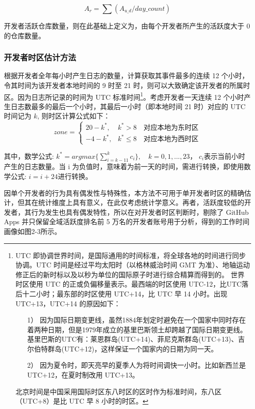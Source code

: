 $$ A_{r} = \sum (A_{u\_d} / day\_count) $$

开发者活跃仓库数量，则在此基础上定义为，由每个开发者所产生的活跃度大于 0 的仓库数量。

\subsubsection{开发者时区估计方法}

\par 根据开发者全年每小时产生日志的数量，计算获取其事件最多的连续 12 个小时，令其时间为该开发者本地时间的 9 时至 21 时，则可以大致确定该开发者的所属时区。因为日志所记录的时间为 UTC 标准时间\footnote{
UTC 即协调世界时间，是国际通用的时间标准，将全球各地的时间进行同步协调。UTC 时间是经过平均太阳时（以格林威治时间 GMT 为准）、地轴运动修正后的新时标以及以秒为单位的国际原子时进行综合精算而得到的。
世界时区使用 UTC 的正或负偏移量表示。最西端的时区使用 UTC-12，比UTC落后十二小时；最东部的时区使用 UTC+14，比 UTC 早 14 小时。出现 UTC+13，UTC+14 的原因如下：
    \begin{enumerate}
        \item[1）] 因为国际日期变更线，虽然1884年划定时避免在一个国家中同时存在着两种日期，但是1979年成立的基里巴斯领土却跨越了国际日期变更线。基里巴斯的UTC有：莱恩群岛(UTC+14)、菲尼克斯群岛(UTC+13)、吉尔伯特群岛(UTC+12)，这样保证一个国家内的日期为同一天。
        \item[2）] 因为夏令时，即天亮早的夏季人为将时间调快一小时。比如新西兰是 UTC+12，在夏时制改用 UTC+13。
    \end{enumerate}
北京时间是中国采用国际时区东八时区的区时作为标准时间，东八区（UTC+8）是比 UTC 早 8 小时的时区。
}。考虑开发者一天连续 12 个小时产生日志数最多的最后一个小时，其最后一小时（即本地时间 21 时）对应的 UTC 时间记为 $ k $, 则时区计算公式如下：
$$
    zone=
    \begin{cases}
        20-k^*, & k^*>8 \quad \text{对应本地为东时区}     \\
        -4-k^*, & k^*\le 8  \quad \text{对应本地为西时区}
    \end{cases}
$$

\par 其中，数学公式: $ k^*=argmax\{\sum_{i=k-11}^{k}{c_i} \},\quad  k=0,1,...,23 $， $ c_i $表示当前小时产生的日志数量。当 i 为负值时，意味着为前一天的时间，需进行转换，即使用数学公式: $ i=i+24 $进行转换。

\par 因单个开发者的行为具有偶发性与特殊性，本方法不可用于单开发者时区的精确估计，但其在统计维度上具有意义，在此仅考虑统计学意义。再者，活跃度较低的开发者，其行为发生也具有偶发特性，所以在对开发者时区判断时，剔除了 GitHub Apps 并只保留全域活跃度排名前 5 万名的开发者账号用于分析，得到的工作时间画像如图2-3所示。

